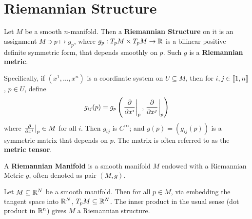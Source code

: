 \documentclass{article}
\begin{document}

\tableofcontents
\newpage

\section{Riemannian Structure}

\begin{definition}
    Let $M$ be a smooth $n$-manifold. Then a \textbf{Riemannian Structure} on it is an assignment $M \ni p \mapsto g_p$, where $g_p: T_p M \times T_p M \to \mathbb{R}$ is a bilinear positive definite symmetric form, that depends smoothly on $p$. Such $g$ is a \textbf{Riemannian metric}. 
    
    Specifically, if $(x^1, \dots, x^n)$ is a coordinate system on $U \subseteq M$, then for $i, j \in \llbracket 1, n \rrbracket$, $p \in U$, define
    \[
        g_{ij}(p) = g_p\left(\left.\frac{\partial }{\partial x^i}\right|_{p}, \left.\frac{\partial }{\partial x^j}\right|_{p}\right)
    \]
    where $\left.\frac{\partial }{\partial x^i}\right|_{p} \in M$ for all $i$. Then $g_{ij}$ is $C^{\infty}$; and $g(p) = (g_{ij}(p))$ is a symmetric matrix that depends on $p$. The matrix is often referred to as the \textbf{metric tensor}.
\end{definition}

\begin{definition}
    A \textbf{Riemannian Manifold} is a smooth manifold $M$ endowed with a Riemannian Metric $g$, often denoted as pair $(M, g)$. 
\end{definition}

\begin{example}
    Let $M \subseteq \mathbb{R}^N$ be a smooth manifold. Then for all $p \in M$, via embedding the tangent space into $\mathbb{R}^N$, $T_p M \subseteq \mathbb{R}^N$. The inner product in the usual sense (dot product in $\mathbb{R}^n$) gives $M$ a Riemannian structure.
\end{example}
\end{document}
